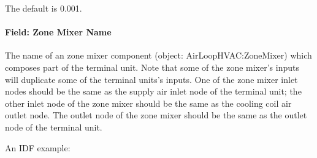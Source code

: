 The default is 0.001.

\paragraph{Field: Zone Mixer Name}\label{field-zone-mixer-name-2}

The name of an zone mixer component (object: AirLoopHVAC:ZoneMixer) which composes part of the terminal unit. Note that some of the zone mixer's inputs will duplicate some of the terminal units's inputs. One of the zone mixer inlet nodes should be the same as the supply air inlet node of the terminal unit; the other inlet node of the zone mixer should be the same as the cooling coil air outlet node. The outlet node of the zone mixer should be the same as the outlet node of the terminal unit.

An IDF example:

